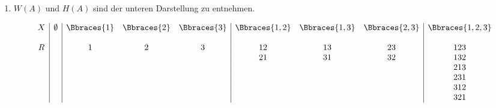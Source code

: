 \begin{solution}

\phantom{}

\begin{comment}

  \begin{enumerate}[label = \alph*.]
    \item
    \begin{align*}
      W(A)
      = \{ 1 \leq 2 \leq 3; 1 \leq 3 \leq 2; 2 \leq 1 \leq 3; 2 \leq 3 \leq 1;
      3 \leq 1 \leq 2; 3 \leq 2 \leq 1\}
    \end{align*}
    Wir können die Elemente aus $W(A)$ in kanonischer Weise mit den
    Permutationen auf der Menge $A = \{1, 2, 3\}$ identifizieren.
    Dabei sind alle linearen Ordnungen vermöge der jeweiligen Permutation
    isomorph,  also hat $H(A)$ genau ein Element.
    \item Ist nicht für alle $n$ $H(A)$ einfach ein-elementig?
  \end{enumerate}

\end{comment}

\begin{enumerate}[label = \alph*.]

  \item $W(A)$ und $H(A)$ sind der unteren Darstellung zu entnehmen.

  \begin{align*}
    \begin{array}{c|c|ccc|ccc|c}
      X & \emptyset & \Bbraces{1} & \Bbraces{2} & \Bbraces{3} & \Bbraces{1, 2} & \Bbraces{1, 3} & \Bbraces{2, 3} & \Bbraces{1, 2, 3} \\
        &           &             &             &             &                &                &                &                   \\
      R &           & 1           & 2           & 3           & 1 2            & 1 3            & 2 3            & 1 2 3             \\
        &           &             &             &             & 2 1            & 3 1            & 3 2            & 1 3 2             \\
        &           &             &             &             &                &                &                & 2 1 3             \\
        &           &             &             &             &                &                &                & 2 3 1             \\
        &           &             &             &             &                &                &                & 3 1 2             \\
        &           &             &             &             &                &                &                & 3 2 1             \\
    \end{array}
  \end{align*}


\end{enumerate}
\end{solution}
